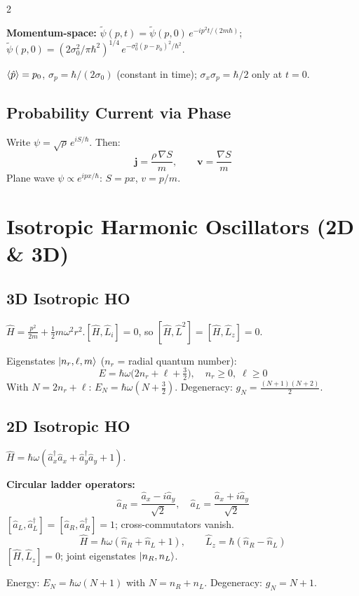 \documentclass[9pt,a4paper]{article} %
\newcommand{\Hhat}{\hat{H}}
\newcommand{\phat}{\hat{p}}
\newcommand{\aop}{\hat{a}}
\newcommand{\adop}{\hat{a}^\dagger}
\begin{document}
\begin{multicols}{2}
{\footnotesize
\textbf{Momentum-space:}
$\tilde{\psi}(p,t)=\tilde{\psi}(p,0)\,e^{-ip^2 t/(2m\hbar)}$;\;
$\tilde{\psi}(p,0)=(2\sigma_0^2/\pi\hbar^2)^{1/4}\,e^{-\sigma_0^2(p-p_0)^2/\hbar^2}$.

$\ev{\phat}=p_0$,\; $\sigma_p=\hbar/(2\sigma_0)$ (constant in time);\; $\sigma_x\sigma_p=\hbar/2$ only at $t=0$.
}

\subsection{Probability Current via Phase}
Write $\psi=\sqrt{\rho}\,e^{iS/\hbar}$.\; Then:
\[
\mathbf{j}=\frac{\rho\,\nabla S}{m},\qquad \mathbf{v}=\frac{\nabla S}{m}
\]
Plane wave $\psi\propto e^{ipx/\hbar}$: $S=px$, $v=p/m$.

\section{Isotropic Harmonic Oscillators (2D \& 3D)}

\subsection{3D Isotropic HO}
$\Hhat=\frac{p^2}{2m}+\frac{1}{2}m\omega^2 r^2$.\quad $[\Hhat,\hat{L}_i]=0$, so $[\Hhat,\hat{L}^2]=[\Hhat,\hat{L}_z]=0$.

Eigenstates $\ket{n_r,\ell,m}$ ($n_r$ = radial quantum number):
\[
\boxed{E=\hbar\omega\!\bigl(2n_r+\ell+\tfrac{3}{2}\bigr),\quad n_r\ge 0,\;\ell\ge 0}
\]
With $N=2n_r+\ell$: $E_N=\hbar\omega(N+\frac{3}{2})$.\quad
Degeneracy: $g_N=\frac{(N+1)(N+2)}{2}$.

\subsection{2D Isotropic HO}
$\Hhat=\hbar\omega(\adop_x\aop_x+\adop_y\aop_y+1)$.

\textbf{Circular ladder operators:}
\[
\aop_R=\frac{\aop_x-i\aop_y}{\sqrt{2}},\quad \aop_L=\frac{\aop_x+i\aop_y}{\sqrt{2}}
\]
$[\aop_L,\adop_L]=[\aop_R,\adop_R]=1$; cross-commutators vanish.
\[
\Hhat=\hbar\omega(\hat{n}_R+\hat{n}_L+1),\qquad \hat{L}_z=\hbar(\hat{n}_R-\hat{n}_L)
\]
$[\Hhat,\hat{L}_z]=0$; joint eigenstates $\ket{n_R,n_L}$.

Energy: $E_N=\hbar\omega(N+1)$ with $N=n_R+n_L$.\;
Degeneracy: $g_N=N+1$.


\end{multicols}
\end{document}
